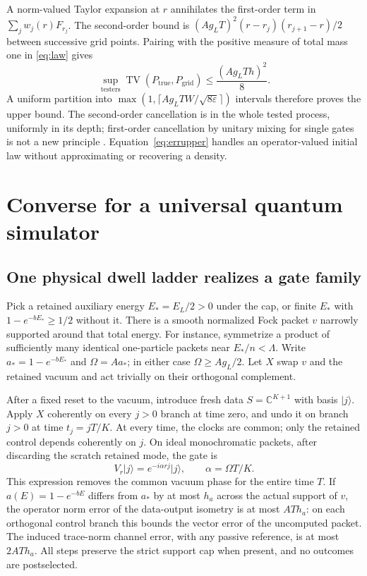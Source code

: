 \documentclass[11pt]{article}
\theoremstyle{remark}
\newcommand{\TV}{\operatorname{TV}}
\newcommand{\ket}[1]{\lvert #1\rangle}
\begin{document}
A norm-valued Taylor expansion at \(r\) annihilates the first-order
term in \(\sum_j w_j(r)F_{r_j}\). The second-order bound is
\((A g_LT)^2(r-r_j)(r_{j+1}-r)/2\) between successive grid points.
Pairing with the positive measure of total mass one in
\eqref{eq:law} gives
\begin{equation}\label{eq:errupper}
 \sup_{\mathrm{testers}}\TV(P_{\mathrm{true}},P_{\mathrm{grid}})
 \le \frac{(A g_L T h)^2}{8}.
\end{equation}
A uniform partition into
\(\max(1,\lceil A g_L T W/\sqrt{8\varepsilon}\rceil)\) intervals
therefore proves the upper bound. The second-order cancellation is
in the whole tested process, uniformly in its depth; first-order
cancellation by unitary mixing for single gates is not a new
principle \cite{Campbell}. Equation~\eqref{eq:errupper} handles an
operator-valued initial law without approximating or recovering a
density.

\section{Converse for a universal quantum simulator}\label{sec:lower}

\subsection{One physical dwell ladder realizes a gate family}

Pick a retained auxiliary energy \(E_*=E_L/2>0\) under the cap,
or finite \(E_*\) with \(1-e^{-bE_*}\ge 1/2\) without it. There is a
smooth normalized Fock packet \(v\) narrowly supported around that
total energy. For instance, symmetrize a product of sufficiently
many identical one-particle packets near \(E_*/n<\Lambda\).
Write \(a_*=1-e^{-bE_*}\) and \(\Omega=Aa_*\); in either case
\(\Omega\ge A g_L/2\). Let \(X\) swap \(v\) and the retained
vacuum and act trivially on their orthogonal complement.

After a fixed reset to the vacuum, introduce fresh data
\(S=\mathbb C^{K+1}\) with basis \(\ket j\).
Apply \(X\) coherently on every \(j>0\) branch at time zero, and
undo it on branch \(j>0\) at time \(t_j=jT/K\). At every time,
the clocks are common; only the retained control depends coherently
on \(j\). On ideal monochromatic packets, after discarding the
scratch retained mode, the gate is
\begin{equation}\label{eq:gate}
 V_r\ket j=e^{-i\alpha rj}\ket j,\qquad \alpha=\Omega T/K.
\end{equation}
This expression removes the common vacuum phase for the entire
time \(T\). If \(a(E)=1-e^{-bE}\) differs from \(a_*\) by at most
\(h_a\) across the actual support of \(v\), the operator norm error
of the data-output isometry is at most \(AT h_a\): on each
orthogonal control branch this bounds the vector error of the
uncomputed packet. The induced trace-norm channel error, with any
passive reference, is at most \(2AT h_a\). All steps preserve the
strict support cap when present, and no outcomes are postselected.
\end{document}
